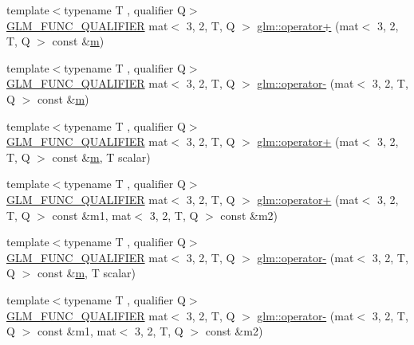 \begin{DoxyCompactItemize}
\item 
{\footnotesize template$<$typename T , qualifier Q$>$ }\\\hyperlink{setup_8hpp_a33fdea6f91c5f834105f7415e2a64407}{G\+L\+M\+\_\+\+F\+U\+N\+C\+\_\+\+Q\+U\+A\+L\+I\+F\+I\+ER} mat$<$ 3, 2, T, Q $>$ \hyperlink{namespaceglm_a00d05fc731c3d1fd422057580f26e9f3}{glm\+::operator+} (mat$<$ 3, 2, T, Q $>$ const \&\hyperlink{_s_d_l__opengl__glext_8h_af593500c283bf1a787a6f947f503a5c2}{m})
\item 
{\footnotesize template$<$typename T , qualifier Q$>$ }\\\hyperlink{setup_8hpp_a33fdea6f91c5f834105f7415e2a64407}{G\+L\+M\+\_\+\+F\+U\+N\+C\+\_\+\+Q\+U\+A\+L\+I\+F\+I\+ER} mat$<$ 3, 2, T, Q $>$ \hyperlink{namespaceglm_a4c4badbd6ef6ab9804d99d755fb8a277}{glm\+::operator-\/} (mat$<$ 3, 2, T, Q $>$ const \&\hyperlink{_s_d_l__opengl__glext_8h_af593500c283bf1a787a6f947f503a5c2}{m})
\item 
{\footnotesize template$<$typename T , qualifier Q$>$ }\\\hyperlink{setup_8hpp_a33fdea6f91c5f834105f7415e2a64407}{G\+L\+M\+\_\+\+F\+U\+N\+C\+\_\+\+Q\+U\+A\+L\+I\+F\+I\+ER} mat$<$ 3, 2, T, Q $>$ \hyperlink{namespaceglm_aaa32473c452e73fc4eb88f03726597c5}{glm\+::operator+} (mat$<$ 3, 2, T, Q $>$ const \&\hyperlink{_s_d_l__opengl__glext_8h_af593500c283bf1a787a6f947f503a5c2}{m}, T scalar)
\item 
{\footnotesize template$<$typename T , qualifier Q$>$ }\\\hyperlink{setup_8hpp_a33fdea6f91c5f834105f7415e2a64407}{G\+L\+M\+\_\+\+F\+U\+N\+C\+\_\+\+Q\+U\+A\+L\+I\+F\+I\+ER} mat$<$ 3, 2, T, Q $>$ \hyperlink{namespaceglm_a7298d6a215681bb8db9d534e6afa6562}{glm\+::operator+} (mat$<$ 3, 2, T, Q $>$ const \&m1, mat$<$ 3, 2, T, Q $>$ const \&m2)
\item 
{\footnotesize template$<$typename T , qualifier Q$>$ }\\\hyperlink{setup_8hpp_a33fdea6f91c5f834105f7415e2a64407}{G\+L\+M\+\_\+\+F\+U\+N\+C\+\_\+\+Q\+U\+A\+L\+I\+F\+I\+ER} mat$<$ 3, 2, T, Q $>$ \hyperlink{namespaceglm_a5199599463fc528e4ee85e8202abdd24}{glm\+::operator-\/} (mat$<$ 3, 2, T, Q $>$ const \&\hyperlink{_s_d_l__opengl__glext_8h_af593500c283bf1a787a6f947f503a5c2}{m}, T scalar)
\item 
{\footnotesize template$<$typename T , qualifier Q$>$ }\\\hyperlink{setup_8hpp_a33fdea6f91c5f834105f7415e2a64407}{G\+L\+M\+\_\+\+F\+U\+N\+C\+\_\+\+Q\+U\+A\+L\+I\+F\+I\+ER} mat$<$ 3, 2, T, Q $>$ \hyperlink{namespaceglm_a34ac4f10148485d75cb6ad599ebe79f7}{glm\+::operator-\/} (mat$<$ 3, 2, T, Q $>$ const \&m1, mat$<$ 3, 2, T, Q $>$ const \&m2)

\end{DoxyCompactItemize}

